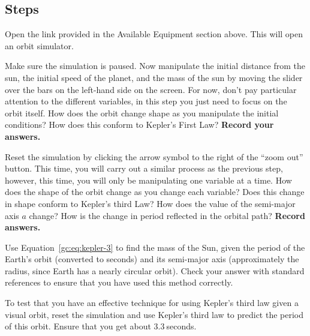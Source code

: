 \subsection{Steps}
\begin{steps}
	\item Open the link provided in the Available Equipment section above. This will open an orbit simulator.
	
	\item Make sure the simulation is paused. Now manipulate the initial distance from the sun, the initial speed of the planet, and the mass of the sun by moving the slider over the bars on the left-hand side on the screen. For now, don't pay particular attention to the different variables, in this step you just need to focus on the orbit itself. How does the orbit change shape as you manipulate the initial conditions? How does this conform to Kepler's First Law? \textbf{Record your answers.}
	
	\item Reset the simulation by clicking the arrow symbol to the right of the ``zoom out'' button. This time, you will carry out a similar process as the previous step, however, this time, you will only be manipulating one variable at a time. How does the shape of the orbit change as you change each variable? Does this change in shape conform to Kepler's third Law? How does the value of the semi-major axis $a$ change? How is the change in period reflected in the orbital path? \textbf{Record answers.}
	
	\item Use Equation~\ref{gc:eq:kepler-3} to find the mass of the Sun, given the period of the Earth's orbit (converted to seconds) and its semi-major axis (approximately the radius, since Earth has a nearly circular orbit). Check your answer with standard references to ensure that you have used this method correctly.
	
	\item To test that you have an effective technique for using Kepler's third law given a visual orbit, reset the simulation and use Kepler's third law to predict the period of this orbit. Ensure that you get about $3.3\:$seconds.

	
\end{steps}

